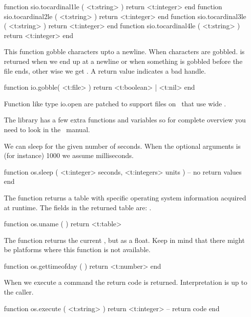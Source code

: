 function sio.tocardinal1le ( <t:string> ) return <t:integer> end
function sio.tocardinal2le ( <t:string> ) return <t:integer> end
function sio.tocardinal3le ( <t:string> ) return <t:integer> end
function sio.tocardinal4le ( <t:string> ) return <t:integer> end
\stoptyping

\stopsubsection

\startsubsection[title=Extra file helpers]

This function gobble characters upto a newline. When characters are gobbled.
 is returned when we end up at a newline or when something is gobbled
before the file ends, other wise we get . A  return value
indicates a bad handle.

\starttyping[option=LUA]
function io.gobble( <t:file> )
    return <t:boolean> | <t:nil>
end
\stoptyping

Function like type {io.open}  are patched to support files on
\MSWINDOWS\ that use wide \UNICODE.

\stopsubsection

\startsubsection[title=Extra operating system helpers]

The  library has a few extra functions and variables so for complete
overview you need to look in the \LUA\ manual.

We can sleep for the given number of seconds. When the optional 
arguments is (for instance) 1000 we assume milliseconds.

\starttyping[option=LUA]
function os.sleep (
    <t:integer>  seconds,
    <t:integers> units
)
    -- no return values
end
\stoptyping

The  function returns a table with specific operating system
information acquired at runtime. The fields in the returned table are:
.

\starttyping[option=LUA]
function os.uname ( )
    return <t:table>
\stoptyping

The  function returns the current ,
but as a float. Keep in mind that there might be platforms where this function is
not available.

\starttyping[option=LUA]
function os.gettimeofday ( )
    return <t:number>
end
\stoptyping

When we execute a command the return code is returned. Interpretation is up to
the caller.

\starttyping[option=LUA]
function os.execute ( <t:string> )
    return <t:integer> -- return code
end
\stoptyping

